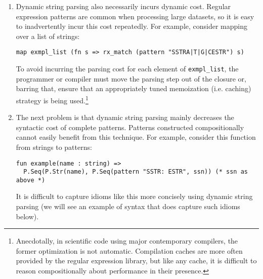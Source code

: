\begin{enumerate}
\item Dynamic string parsing also necessarily incurs dynamic cost. Regular expression patterns are common when processing large datasets, so it is easy to inadvertently incur this cost repeatedly. For example, consider mapping over a list of strings:
\begin{lstlisting}[numbers=none]
map exmpl_list (fn s => rx_match (pattern "SSTRA|T|G|CESTR") s)
\end{lstlisting}
To avoid incurring the parsing cost for each element of \lstinline{exmpl_list}, the programmer or compiler must move the parsing step out of the closure or, barring that, ensure that an appropriately tuned memoization (i.e. caching) strategy is being used.\footnote{Anecdotally, in scientific code using major contemporary compilers, the former optimization is not automatic. Compilation caches are more often provided by the regular expression library, but like any cache, it is difficult to reason compositionally about performance in their presence.} %


\item The next problem is that dynamic string parsing mainly decreases the syntactic cost of complete patterns. Patterns constructed compositionally cannot easily benefit from this technique. For example, consider this function from strings to patterns:
\begin{lstlisting}[numbers=none]
fun example(name : string) => 
  P.Seq(P.Str(name), P.Seq(pattern "SSTR: ESTR", ssn)) (* ssn as above *)
\end{lstlisting}
It is difficult to capture idioms like this more concisely using dynamic string parsing (we will see an example of syntax that does capture such idioms below).


\end{enumerate}
